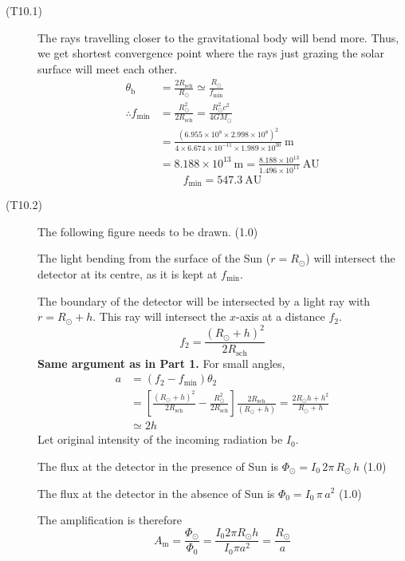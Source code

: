 \begin{description}
\item[(T10.1)] The rays travelling closer to the gravitational body will bend
more. Thus, we get shortest convergence point where the rays just grazing the
solar surface will meet each other.
\begin{align*}
\theta_{\mathrm{b}} &= \frac{2R_{\mathrm{sch}}}{R_\odot}
  \simeq \frac{R_\odot}{f_{\min}} \tag*{(2.0)}\\
\therefore f_{\min} &= \frac{R_\odot^2}{2R_{\mathrm{sch}}}
  = \frac{R_\odot^2 c^2}{4GM_\odot} \tag*{(2.0)}\\
  &= \frac{(6.955 \times 10^{8} \times 2.998 \times 10^{8})^2}
          {4 \times 6.674 \times 10^{-11} \times 1.989 \times 10^{30}}~\mathrm{m}\\
  &= 8.188 \times 10^{13}~\mathrm{m}
   = \frac{8.188 \times 10^{13}}{1.496 \times 10^{11}}~\mathrm{AU}
\end{align*}
\[
\boxed{f_{\min} = 547.3~\mathrm{AU}} \tag*{(2.0)}
\]

\item[(T10.2)] The following figure needs to be drawn. \hfill(1.0)

The light bending from the surface of the Sun ($r = R_\odot$) will intersect
the detector at its centre, as it is kept at $f_{\min}$.

The boundary of the detector will be intersected by a light ray with
$r = R_\odot + h$. This ray will intersect the $x$-axis at a distance $f_2$.
\[
f_2 = \frac{(R_\odot + h)^2}{2R_{\mathrm{sch}}} \tag*{(2.0)}
\]
\textbf{Same argument as in Part 1.} For small angles,
\begin{align*}
a &= (f_2 - f_{\min})\theta_2\\
  &= \left[\frac{(R_\odot + h)^2}{2R_{\mathrm{sch}}}
     - \frac{R_\odot^2}{2R_{\mathrm{sch}}}\right]
     \frac{2R_{\mathrm{sch}}}{(R_\odot + h)}
   = \frac{2R_\odot h + h^2}{R_\odot + h}\\
  &\simeq 2h \tag*{(2.0)}
\end{align*}
Let original intensity of the incoming radiation be $I_0$.

The flux at the detector in the presence of Sun is
$\Phi_\odot = I_0\, 2\pi\, R_\odot\, h$ \hfill(1.0)

The flux at the detector in the absence of Sun is
$\Phi_0 = I_0\, \pi\, a^2$ \hfill(1.0)

The amplification is therefore
\[
A_{\mathrm{m}} = \frac{\Phi_\odot}{\Phi_0}
  = \frac{I_0 2\pi R_\odot h}{I_0 \pi a^2}
  = \boxed{\frac{R_\odot}{a}} \tag*{(1.0)}
\]


\end{description}
